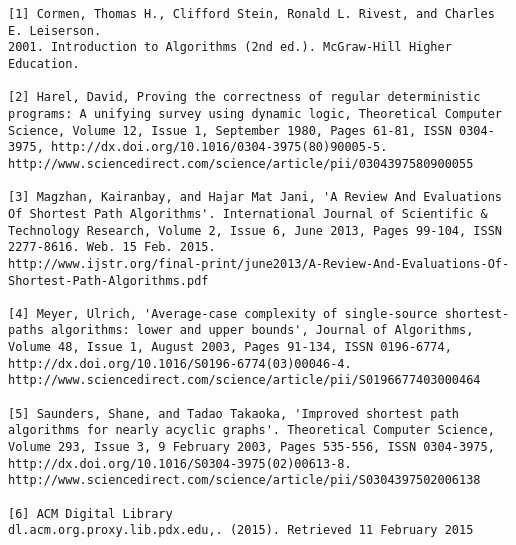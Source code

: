 \documentclass{article}
\begin{document}
\begin{lstlisting}
[1] Cormen, Thomas H., Clifford Stein, Ronald L. Rivest, and Charles E. Leiserson.
2001. Introduction to Algorithms (2nd ed.). McGraw-Hill Higher Education. 

[2] Harel, David, Proving the correctness of regular deterministic programs: A unifying survey using dynamic logic, Theoretical Computer Science, Volume 12, Issue 1, September 1980, Pages 61-81, ISSN 0304-3975, http://dx.doi.org/10.1016/0304-3975(80)90005-5.
http://www.sciencedirect.com/science/article/pii/0304397580900055

[3] Magzhan, Kairanbay, and Hajar Mat Jani, 'A Review And Evaluations Of Shortest Path Algorithms'. International Journal of Scientific & Technology Research, Volume 2, Issue 6, June 2013, Pages 99-104, ISSN 2277-8616. Web. 15 Feb. 2015.
http://www.ijstr.org/final-print/june2013/A-Review-And-Evaluations-Of-Shortest-Path-Algorithms.pdf

[4] Meyer, Ulrich, 'Average-case complexity of single-source shortest-paths algorithms: lower and upper bounds', Journal of Algorithms, Volume 48, Issue 1, August 2003, Pages 91-134, ISSN 0196-6774, http://dx.doi.org/10.1016/S0196-6774(03)00046-4.
http://www.sciencedirect.com/science/article/pii/S0196677403000464

[5] Saunders, Shane, and Tadao Takaoka, 'Improved shortest path algorithms for nearly acyclic graphs'. Theoretical Computer Science, Volume 293, Issue 3, 9 February 2003, Pages 535-556, ISSN 0304-3975, http://dx.doi.org/10.1016/S0304-3975(02)00613-8.
http://www.sciencedirect.com/science/article/pii/S0304397502006138

[6] ACM Digital Library
dl.acm.org.proxy.lib.pdx.edu,. (2015). Retrieved 11 February 2015

\end{lstlisting}
\end{document}
